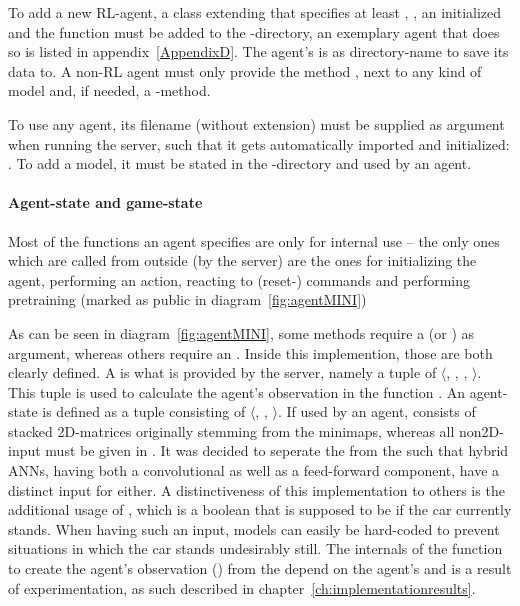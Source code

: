To add a new RL-agent, a class extending  that specifies at least , , an initialized  and the function  must be added to the -directory, an exemplary agent that does so is listed in appendix~\ref{AppendixD}. The agent's  is as directory-name to save its data to. A non-RL agent must only provide the method , next to any kind of model and, if needed, a -method.

To use any agent, its filename (without extension) must be supplied as argument when running the server, such that it gets automatically imported and initialized:\\ . To add a model, it must be stated in the -directory and used by an agent.

\paragraph{Agent-state and game-state}

Most of the functions an agent specifies are only for internal use -- the only ones which are called from outside (by the server) are the ones for initializing the agent, performing an action, reacting to (reset-) commands and performing pretraining (marked as public in diagram~\ref{fig:agentMINI})

As can be seen in diagram~\ref{fig:agentMINI}, some methods require a  (or ) as argument, whereas others require an . Inside this implemention, those are both clearly defined. A  is what is provided by the server, namely a tuple of $\langle$, , , $\rangle$. This tuple is used to calculate the agent's observation in the function . An agent-state is defined as a tuple consisting of $\langle$, , $\rangle$. If used by an agent,  consists of stacked 2D-matrices originally stemming from the minimaps, whereas all non2D-input must be given in . It was decided to seperate the  from the  such that hybrid ANNs, having both a convolutional as well as a feed-forward component, have a distinct input for either. A distinctiveness of this implementation to others is the additional usage of , which is a boolean that is supposed to be  if the car currently stands. When having such an input, models can easily be hard-coded to prevent situations in which the car stands undesirably still. The internals of the function to create the agent's observation () from the  depend on the agent's  and is a result of experimentation, as such described in chapter~\ref{ch:implementationresults}.

